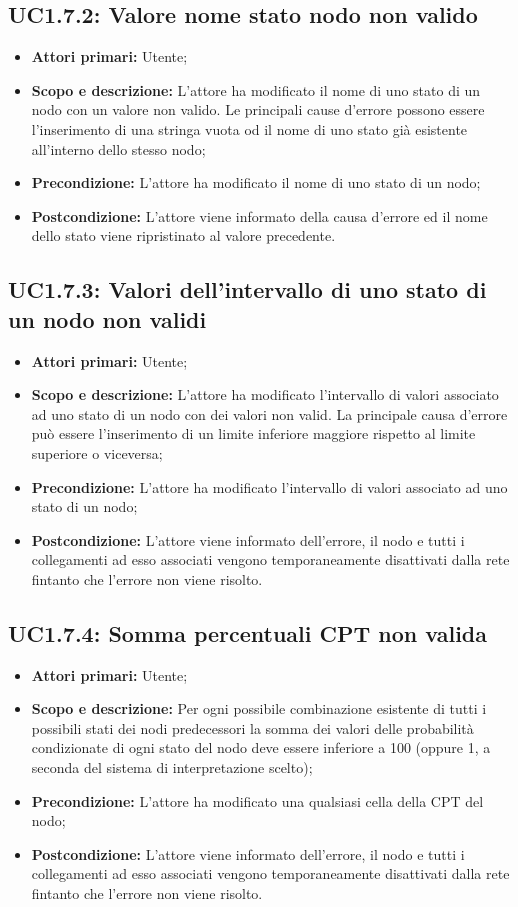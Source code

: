 \subsection{UC1.7.2: Valore nome stato nodo non valido} 
\begin{itemize} 
	\item{\textbf{Attori primari:} Utente;} 
	\item{\textbf{Scopo e descrizione:} L'attore ha modificato il nome di uno stato di un nodo con un valore non valido. Le principali cause d'errore possono essere l'inserimento di una stringa vuota od il nome di uno stato già esistente all'interno dello stesso nodo;} 
	\item{\textbf{Precondizione:} L'attore ha modificato il nome di uno stato di un nodo;} 
	\item{\textbf{Postcondizione:} L'attore viene informato della causa d'errore ed il nome dello stato viene ripristinato al valore precedente.} 
\end{itemize} 
\subsection{UC1.7.3: Valori dell'intervallo di uno stato di un nodo non validi} 
\begin{itemize} 
	\item{\textbf{Attori primari:} Utente;} 
	\item{\textbf{Scopo e descrizione:} L'attore ha modificato l'intervallo di valori associato ad uno stato di un nodo con dei valori non valid. La principale causa d'errore può essere l'inserimento di un limite inferiore maggiore rispetto al limite superiore o viceversa;} 
	\item{\textbf{Precondizione:} L'attore ha modificato l'intervallo di valori associato ad uno stato di un nodo;} 
	\item{\textbf{Postcondizione:} L'attore viene informato dell'errore, il nodo e tutti i collegamenti ad esso associati vengono temporaneamente disattivati dalla rete fintanto che l'errore non viene risolto.} 
\end{itemize} 
\subsection{UC1.7.4: Somma percentuali CPT non valida} 
\begin{itemize} 
	\item{\textbf{Attori primari:} Utente;} 
	\item{\textbf{Scopo e descrizione:} Per ogni possibile combinazione esistente di tutti i possibili stati dei nodi predecessori la somma dei valori delle probabilità condizionate di ogni stato del nodo deve essere inferiore a 100 (oppure 1, a seconda del sistema di interpretazione scelto);} 
	\item{\textbf{Precondizione:} L'attore ha modificato una qualsiasi cella della CPT del nodo;} 
	\item{\textbf{Postcondizione:} L'attore viene informato dell'errore, il nodo e tutti i collegamenti ad esso associati vengono temporaneamente disattivati dalla rete fintanto che l'errore non viene risolto.}
\end{itemize} 
